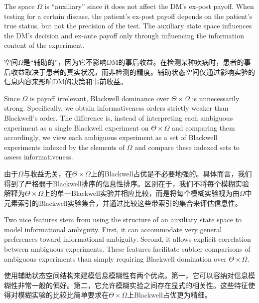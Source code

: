 \documentclass[12pt,a4paper]{article}
\newenvironment{original}
  {\par\vspace{4pt}\noindent\color{black}\ignorespaces}
  {\par\vspace{2pt}}
\newenvironment{translation}
  {\par\vspace{2pt}\noindent\color{myblue}\ignorespaces}
  {\par\vspace{6pt}}
\begin{document}
\begin{original}
The space $\Omega$ is ``auxiliary'' since it does not affect the DM's ex-post payoff. When testing for a certain disease, the patient's ex-post payoff depends on the patient's true status, but not the precision of the test. The auxiliary state space influences the DM's decision and ex-ante payoff only through influencing the information content of the experiment.
\end{original}

\begin{translation}
空间$\Omega$是``辅助的''，因为它不影响DM的事后收益。在检测某种疾病时，患者的事后收益取决于患者的真实状况，而非检测的精度。辅助状态空间仅通过影响实验的信息内容来影响DM的决策和事前收益。
\end{translation}

\begin{original}
Since $\Omega$ is payoff irrelevant, Blackwell dominance over $\Theta\times\Omega$ is unnecessarily strong. Specifically, we obtain informativeness orders strictly weaker than Blackwell's order. The difference is, instead of interpreting each ambiguous experiment as a single Blackwell experiment on $\Theta\times\Omega$ and comparing them accordingly, we view each ambiguous experiment as a set of Blackwell experiments indexed by the elements of $\Omega$ and compare these indexed sets to assess informativeness.
\end{original}

\begin{translation}
由于$\Omega$与收益无关，在$\Theta\times\Omega$上的Blackwell占优是不必要地强的。具体而言，我们得到了严格弱于Blackwell排序的信息性排序。区别在于，我们不将每个模糊实验解释为$\Theta\times\Omega$上的单一Blackwell实验并相应比较，而是将每个模糊实验视为由$\Omega$中元素索引的Blackwell实验集合，并通过比较这些带索引的集合来评估信息性。
\end{translation}

\begin{original}
Two nice features stem from using the structure of an auxiliary state space to model informational ambiguity. First, it can accommodate very general preferences toward informational ambiguity. Second, it allows explicit correlation between ambiguous experiments. These features facilitate subtler comparisons of ambiguous experiments than simply requiring Blackwell domination over $\Theta\times\Omega$.
\end{original}

\begin{translation}
使用辅助状态空间结构来建模信息模糊性有两个优点。第一，它可以容纳对信息模糊性非常一般的偏好。第二，它允许模糊实验之间存在显式的相关性。这些特征使得对模糊实验的比较比简单要求在$\Theta\times\Omega$上Blackwell占优更为精细。
\end{translation}
\end{document}
